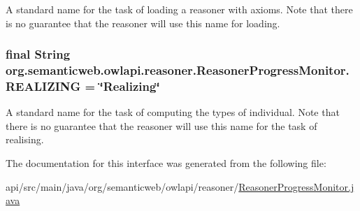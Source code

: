 A standard name for the task of loading a reasoner with axioms. Note that there is no guarantee that the reasoner will use this name for loading. \hypertarget{interfaceorg_1_1semanticweb_1_1owlapi_1_1reasoner_1_1_reasoner_progress_monitor_a54ba2f85ade258995e72418cca364d70}{
\subsubsection[{R\-E\-A\-L\-I\-Z\-I\-N\-G}]{\setlength{\rightskip}{0pt plus 5cm}final String org.\-semanticweb.\-owlapi.\-reasoner.\-Reasoner\-Progress\-Monitor.\-R\-E\-A\-L\-I\-Z\-I\-N\-G = \char`\"{}Realizing\char`\"{}\hspace{0.3cm}{\ttfamily [static]}}}\label{interfaceorg_1_1semanticweb_1_1owlapi_1_1reasoner_1_1_reasoner_progress_monitor_a54ba2f85ade258995e72418cca364d70}
A standard name for the task of computing the types of individual. Note that there is no guarantee that the reasoner will use this name for the task of realising. 

The documentation for this interface was generated from the following file\-:\begin{DoxyCompactItemize}
\item 
api/src/main/java/org/semanticweb/owlapi/reasoner/\hyperlink{_reasoner_progress_monitor_8java}{Reasoner\-Progress\-Monitor.\-java}\end{DoxyCompactItemize}
